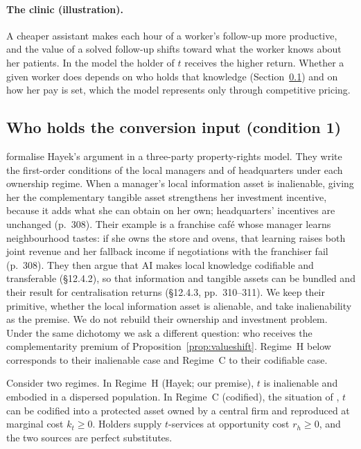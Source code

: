 \documentclass[12pt]{article}
\theoremstyle{remark}
\begin{document}
\paragraph{The clinic (illustration).} A cheaper assistant makes each hour of a worker's follow-up more productive, and the value of a solved follow-up shifts toward what the worker knows about her patients. In the model the holder of $t$ receives the higher return. Whether a given worker does depends on who holds that knowledge (Section~\ref{sec:regime}) and on how her pay is set, which the model represents only through competitive pricing.

\subsection{Who holds the conversion input (condition 1)}\label{sec:regime}

\citet[\S12.4, pp.~307--311]{brynjolfsson2026hayek} formalise Hayek's argument in a three-party property-rights model. They write the first-order conditions of the local managers and of headquarters under each ownership regime. When a manager's local information asset is inalienable, giving her the complementary tangible asset strengthens her investment incentive, because it adds what she can obtain on her own; headquarters' incentives are unchanged (p.~308). Their example is a franchise caf\'e whose manager learns neighbourhood tastes: if she owns the store and ovens, that learning raises both joint revenue and her fallback income if negotiations with the franchiser fail (p.~308). They then argue that AI makes local knowledge codifiable and transferable (\S12.4.2), so that information and tangible assets can be bundled and their result for centralisation returns (\S12.4.3, pp.~310--311). We keep their primitive, whether the local information asset is alienable, and take inalienability as the premise. We do not rebuild their ownership and investment problem. Under the same dichotomy we ask a different question: who receives the complementarity premium of Proposition~\ref{prop:valueshift}. Regime~H below corresponds to their inalienable case and Regime~C to their codifiable case.

Consider two regimes. In Regime~H (Hayek; our premise), $t$ is inalienable and embodied in a dispersed population. In Regime~C (codified), the situation of \citet[\S12.4.3]{brynjolfsson2026hayek}, $t$ can be codified into a protected asset owned by a central firm and reproduced at marginal cost $k_t\ge0$. Holders supply $t$-services at opportunity cost $r_h\ge0$, and the two sources are perfect substitutes.
\end{document}
